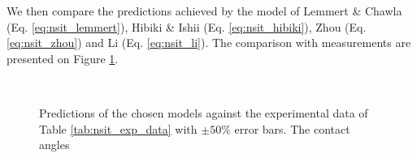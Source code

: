 We then compare the predictions achieved by the model of Lemmert \& Chawla (Eq. \ref{eq:nsit_lemmert}), Hibiki \& Ishii (Eq. \ref{eq:nsit_hibiki}), Zhou \etal (Eq. \ref{eq:nsit_zhou}) and Li \etal (Eq. \ref{eq:nsit_li}).  The comparison with measurements are presented on Figure \ref{fig:pred_nsit_models}.




\begin{figure}[!h]
\centering
{} 
\\

\caption{Predictions of the chosen models against the experimental data of Table \ref{tab:nsit_exp_data} with $\pm 50\%$ error bars. The contact angles}
\label{fig:pred_nsit_models}
\end{figure}

